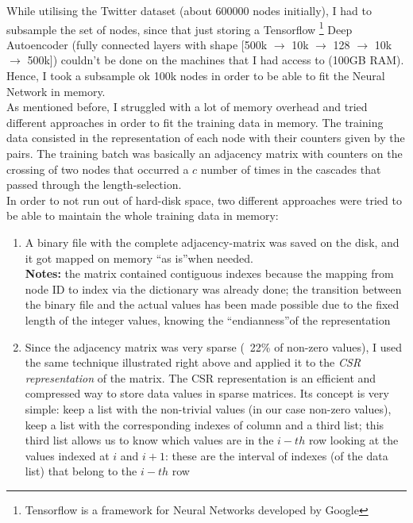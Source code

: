 \documentclass{article}
\begin{document}
			While utilising the Twitter dataset (about 600000 nodes initially), I had to subsample the set of nodes, since that just storing a Tensorflow \footnote{Tensorflow is a framework for Neural Networks developed by Google} Deep Autoencoder (fully connected layers with shape [500k $\rightarrow$ 10k $\rightarrow$ 128 $\rightarrow$ 10k $\rightarrow$ 500k]) couldn't be done on the machines that I had access to (100GB RAM). Hence, I took a subsample ok 100k nodes in order to be able to fit the Neural Network in memory.\\
			As mentioned before, I struggled with a lot of memory overhead and tried different approaches in order to fit the training data in memory. The training data consisted in the representation of each node with their counters given by the pairs. The training batch was basically an adjacency matrix with counters on the crossing of two nodes that occurred a $c$ number of times in the cascades that passed through the length-selection.\\
			In order to not run out of hard-disk space, two different approaches were tried to be able to maintain the whole training data in memory:\\
			\begin{enumerate}
				\item A binary file with the complete adjacency-matrix was saved on the disk, and it got mapped on memory \textquotedblleft as is\textquotedblright when needed.\\
				\textbf{Notes:} the matrix contained contiguous indexes because the mapping from node ID to index via the dictionary was already done; the transition between the binary file and the actual values has been made possible due to the fixed length of the integer values, knowing the \textquotedblleft endianness\textquotedblright of the representation
				\item Since the adjacency matrix was very sparse (~22\% of non-zero values), I used the same technique illustrated right above and applied it to the \textit{CSR representation} of the matrix. The CSR representation is an efficient and compressed way to store data values in sparse matrices. Its concept is very simple: keep a list with the non-trivial values (in our case non-zero values), keep a list with the corresponding indexes of column and a third list; this third list allows us to know which values are in the $i-th$ row looking at the values indexed at $i$ and $i+1$: these are the interval of indexes (of the data list) that belong to the $i-th$ row
			\end{enumerate}
\end{document}
